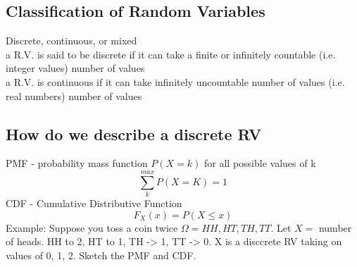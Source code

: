 \documentclass[12pt]{article}
\begin{document}
    \subsection{Classification of Random Variables}

    Discrete, continuous, or mixed\\
    a R.V. is said to be discrete if it can take a finite or infinitely countable (i.e. integer values) number of values\\
    a R.V. is continuous if it can take infinitely uncountable number of values (i.e. real numbers) number of values\\
    \subsection*{How do we describe a discrete RV}
    PMF - probability mass function $P(X=k)$ for all possible values of k 
    $$\sum_{k}^{max}P(X=K) = 1$$
    CDF - Cumulative Distributive Function\\
    $$F_X(x) = P(X \leq x)$$
    Example: Suppose you toss a coin twice $\Omega = {HH, HT, TH, TT}$. Let $X =$ number of heads. HH to 2, HT to 1, TH -> 1, TT -> 0. 
    X is a disccrete RV taking on values of 0, 1, 2. Sketch the PMF and CDF.\\
\end{document}

